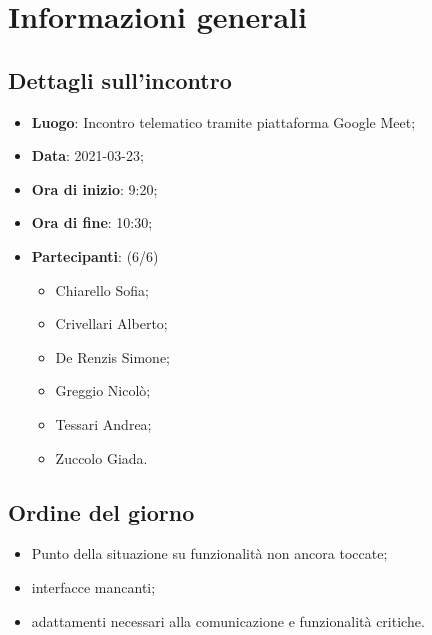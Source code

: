 \section{Informazioni generali}

\subsection{Dettagli sull'incontro}
\begin{itemize}
\item \textbf{Luogo}: Incontro telematico tramite piattaforma Google Meet;
\item \textbf{Data}: 2021-03-23;
\item \textbf{Ora di inizio}: 9:20;
\item \textbf{Ora di fine}: 10:30;
\item \textbf{Partecipanti}: (6/6)
\begin{itemize}
	\item Chiarello Sofia;
	\item Crivellari Alberto;
	\item De Renzis Simone;
	\item Greggio Nicolò;
	\item Tessari Andrea;
	\item Zuccolo Giada.
\end{itemize}
\end{itemize}

\subsection{Ordine del giorno}
\begin{itemize}
	\item Punto della situazione su funzionalità non ancora toccate;
    \item interfacce mancanti;
    \item adattamenti necessari alla comunicazione e funzionalità critiche.

\end{itemize}


